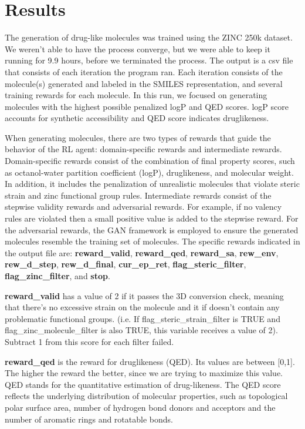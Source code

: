 \documentclass{article}
\begin{document}
\section{Results}
The generation of drug-like molecules was trained using the ZINC 250k dataset. We weren’t able to have the process converge, but we were able to keep it running for 9.9 hours, before we terminated the process. The output is a csv file that consists of each iteration the program ran. Each iteration consists of the molecule(s) generated and labeled in the SMILES representation, and several training rewards for each molecule. In this run, we focused on generating molecules with the highest possible penalized logP and QED scores. logP score accounts for synthetic accessibility and QED score indicates druglikeness.

When generating molecules, there are two types of rewards that guide the behavior of the RL agent: domain-specific rewards and intermediate rewards. Domain-specific rewards consist of the combination of final property scores, such as octanol-water partition coefficient (logP), druglikeness, and molecular weight. In addition, it includes the penalization of unrealistic molecules that violate steric strain and zinc functional group rules. Intermediate rewards consist of the stepwise validity rewards and adversarial rewards. For example, if no valency rules are violated then a small positive value is added to the stepwise reward. For the adversarial rewards, the GAN framework is employed to ensure the generated molecules resemble the training set of molecules. The specific rewards indicated in the output file are: \textbf{reward\_valid}, \textbf{reward\_qed}, \textbf{reward\_sa}, \textbf{rew\_env}, \textbf{rew\_d\_step}, \textbf{rew\_d\_final}, \textbf{cur\_ep\_ret}, \textbf{flag\_steric\_filter}, \textbf{flag\_zinc\_filter}, and \textbf{stop}.

\textbf{reward\_valid} has a value of 2 if it passes the 3D conversion check, meaning that there’s no excessive strain on the molecule and it if doesn’t contain any problematic functional groups. (i.e. If flag\_steric\_strain\_filter is TRUE and flag\_zinc\_molecule\_filter is also TRUE, this variable receives a value of 2). Subtract 1 from this score for each filter failed.

\textbf{reward\_qed} is the reward for druglikeness (QED). Its values are between [0,1]. The higher the reward the better, since we are trying to maximize this value. QED stands for the quantitative estimation of drug-likeness. The QED score reflects the underlying distribution of molecular properties, such as topological polar surface area, number of hydrogen bond donors and acceptors and the number of aromatic rings and rotatable bonds.
\end{document}
